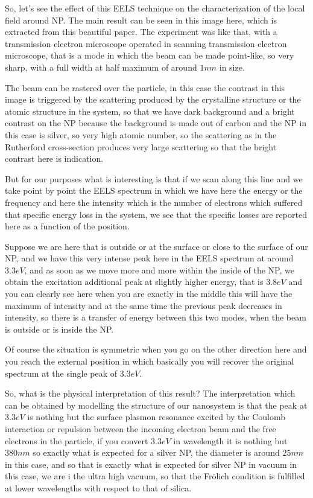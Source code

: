 \documentclass[../main/main.tex]{subfiles}
\begin{document}
So, let's see the effect of this EELS technique on the characterization of the local field around NP. The main result can be seen in this image here, which is extracted from this beautiful paper. The experiment was like that, with a transmission electron microscope operated in scanning transmission electron microscope, that is a mode in which the beam can be made point-like, so very sharp, with a full width at half maximum of around $1 nm$ in size. 

The beam can be rastered over the particle, in this case the contrast in this image is triggered by the scattering produced by the crystalline structure or the atomic structure in the system, so that we have dark background and a bright contrast on the NP because the background is made out of carbon and the NP in this case is silver, so very high atomic number, so the scattering as in the Rutherford cross-section produces very large scattering so that the bright contrast here is indication.

But for our purposes what is interesting is that if we scan along this line and we take point by point the EELS spectrum in which we have here the energy or the frequency and here the intensity which is the number of electrons which suffered that specific energy loss in the system, we see that the specific losses are reported here as a function of the position. 

Suppose we are here that is outside or at the surface or close to the surface of our NP, and we have this very intense peak here in the EELS spectrum at around $3.3 eV$, and as soon as we move more and more within the inside of the NP, we obtain the excitation additional peak at slightly higher energy, that is $3.8 eV$ and you can clearly see here when you are exactly in the middle this will have the maximum of intensity and at the same time the previous peak decreases in intensity, so there is a transfer of energy between this two modes, when the beam is outside or is inside the NP. 

Of course the situation is symmetric when you go on the other direction here and you reach the external position in which basically you will recover the original spectrum at the single peak of $3.3 eV$.

So, what is the physical interpretation of this result? The interpretation which can be obtained by modelling the structure of our nanosystem is that the peak at $3.3 eV$ is nothing but the surface plasmon resonance excited by the Coulomb interaction or repulsion between the incoming electron beam and the free electrons in the particle, if you convert $3.3 eV$ in wavelength it is nothing but $380 nm$ so exactly what is expected for a silver NP, the diameter is around $25 nm$ in this case, and so that is exactly what is expected for silver NP in vacuum in this case, we are i the ultra high vacuum, so that the Fr\"olich condition is fulfilled at lower wavelengths with respect to that of silica.
\end{document}
